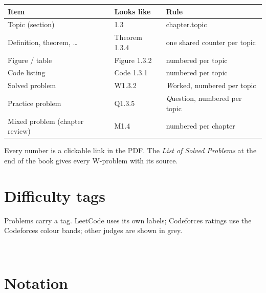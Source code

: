 \begin{center}
\begin{tabular}{@{}lll@{}}
\toprule
\textbf{Item} & \textbf{Looks like} & \textbf{Rule} \\
\midrule
Topic (section)                 & 1.3            & chapter.topic \\
Definition, theorem, \dots      & Theorem 1.3.4  & one shared counter per topic \\
Figure / table                  & Figure 1.3.2   & numbered per topic \\
Code listing                    & Code 1.3.1     & numbered per topic \\
Solved problem                  & W1.3.2         & \emph{W}orked, numbered per topic \\
Practice problem                & Q1.3.5         & \emph{Q}uestion, numbered per topic \\
Mixed problem (chapter review)  & M1.4           & numbered per chapter \\
\bottomrule
\end{tabular}
\end{center}

Every number is a clickable link in the PDF. The \emph{List of Solved
Problems} at the end of the book gives every W-problem with its source.

\section*{Difficulty tags}

Problems carry a tag. LeetCode uses its own labels; Codeforces ratings use
the Codeforces colour bands; other judges are shown in grey.

\begin{center}
\ \ \qquad
{}\ \ \
\ \ \
\qquad
\difficultytag{CSES}\ \difficultytag{AtCoder 1580}
\end{center}

\section*{Notation}

